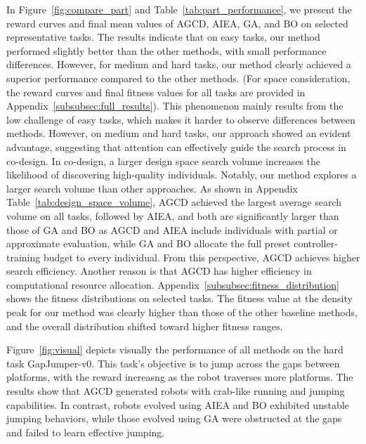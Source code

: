 \documentclass{article}
\begin{document}
    In Figure~\ref{fig:compare_part} and Table~\ref{tab:part_performance}, we
    present the reward curves and final mean values of AGCD, AIEA, GA, and BO on
    selected representative tasks. The results indicate that on easy tasks, our method
    performed slightly better than the other methods, with small performance
    differences. However, for medium and hard tasks, our method clearly achieved
    a superior performance compared to the other methods. (For space consideration,
    the reward curves and final fitness values for all tasks are provided in
    Appendix~\ref{subsubsec:full_results}). This phenomenon mainly results from
    the low challenge of easy tasks, which makes it harder to observe differences
    between methods. However, on medium and hard tasks, our approach showed an
    evident advantage, suggesting that attention can effectively guide the search
    process in co-design. In co-design, a larger design space search volume increases
    the likelihood of discovering high-quality individuals. Notably, our method explores
    a larger search volume than other approaches. As shown in Appendix Table~\ref{tab:design_space_volume},
    AGCD achieved the largest average search volume on all tasks, followed by
    AIEA, and both are significantly larger than those of GA and BO as AGCD and AIEA
    include individuals with partial or approximate evaluation, while GA and BO
    allocate the full preset controller-training budget to every individual.
    From this perspective, AGCD
    achieves higher search efficiency. Another reason is that AGCD has higher efficiency
    in computational resource allocation. Appendix~\ref{subsubsec:fitness_distribution}
    shows the fitness distributions on selected tasks. The fitness value at the density
    peak for our method was clearly higher than those of the other baseline methods,
    and the overall distribution shifted toward higher fitness ranges.

    Figure~\ref{fig:visual} depicts visually the performance of all methods on
    the hard task GapJumper-v0. This task's objective is to jump across the gaps
    between platforms, with the reward increasng as the robot traverses more
    platforms. The results show that AGCD generated robots with crab-like running
    and jumping capabilities. In contrast, robots evolved using AIEA and BO exhibited
    unstable jumping behaviors, while those evolved using GA were obstructed at
    the gaps and failed to learn effective jumping.
\end{document}
